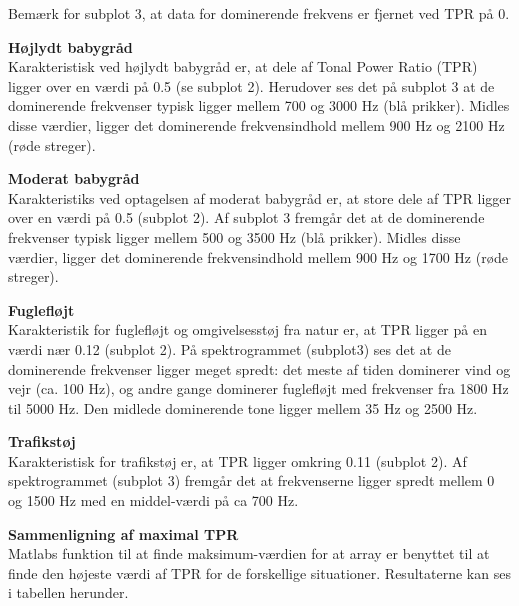 Bemærk for subplot 3, at data for dominerende frekvens er fjernet ved TPR på 0.


\textbf{Højlydt babygråd} \\
Karakteristisk ved højlydt babygråd er, at dele af Tonal Power Ratio (TPR) ligger over en værdi på 0.5 (se subplot 2). Herudover ses det på subplot 3 at de dominerende frekvenser typisk ligger mellem 700 og 3000 Hz (blå prikker). Midles disse værdier, ligger det dominerende frekvensindhold mellem 900 Hz og 2100 Hz (røde streger). 



\newpage
\textbf{Moderat babygråd}\\
Karakteristiks ved optagelsen af moderat babygråd er, at store dele af TPR ligger over en værdi på 0.5 (subplot 2). Af subplot 3 fremgår det at de dominerende frekvenser typisk ligger mellem 500 og 3500 Hz (blå prikker). Midles disse værdier, ligger det dominerende frekvensindhold mellem 900 Hz og 1700 Hz (røde streger). 



\newpage
\textbf{Fuglefløjt}\\
Karakteristik for fuglefløjt og omgivelsesstøj fra natur er, at TPR ligger på en værdi nær 0.12 (subplot 2). På spektrogrammet (subplot3) ses det at de dominerende frekvenser ligger meget spredt: det meste af tiden dominerer vind og vejr (ca. 100 Hz), og andre gange dominerer fuglefløjt med frekvenser fra 1800 Hz til 5000 Hz. Den midlede dominerende tone ligger mellem 35 Hz og 2500 Hz.


\newpage
\textbf{Trafikstøj}\\
Karakteristisk for trafikstøj er, at TPR ligger omkring 0.11 (subplot 2). Af spektrogrammet (subplot 3) fremgår det at frekvenserne ligger spredt mellem 0 og 1500 Hz med en middel-værdi på ca 700 Hz.


\textbf{Sammenligning af maximal TPR}	\\
Matlabs funktion til at finde maksimum-værdien for at array er benyttet til at finde den højeste værdi af TPR for de forskellige situationer. Resultaterne kan ses i tabellen herunder. 

